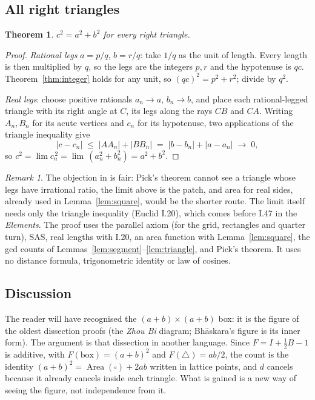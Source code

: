 \documentclass[11pt,a4paper]{article}
\newtheorem{theorem}{Theorem}
\theoremstyle{remark}
\newtheorem*{remark}{Remark}
\begin{document}
\subsection*{All right triangles}

\begin{theorem}\label{thm:general}
$c^2=a^2+b^2$ for every right triangle.
\end{theorem}

\begin{proof}
\emph{Rational legs} $a=p/q$, $b=r/q$: take $1/q$ as the unit of length. Every
length is then multiplied by $q$, so the legs are the integers $p,r$ and the
hypotenuse is $qc$. Theorem~\ref{thm:integer} holds for any unit, so
$(qc)^2=p^2+r^2$; divide by $q^2$.

\emph{Real legs}: choose positive rationals $a_n\to a$, $b_n\to b$, and place each
rational-legged triangle with its right angle at $C$, its legs along the rays
$CB$ and $CA$. Writing $A_n,B_n$ for its acute vertices and $c_n$ for its
hypotenuse, two applications of the triangle inequality give
\[
|c-c_n|\;\le\;|AA_n|+|BB_n|\;=\;|b-b_n|+|a-a_n|\;\longrightarrow\;0 ,
\]
so $c^2=\lim c_n^{\,2}=\lim\,(a_n^2+b_n^2)=a^2+b^2$.
\end{proof}

\begin{remark}
The objection in \cite{mse} is fair: Pick's theorem cannot see a triangle whose
legs have irrational ratio, the limit above is the patch, and area for real
sides, already used in Lemma~\ref{lem:square}, would be the shorter route. The
limit itself needs only the triangle inequality (Euclid I.20), which comes before
I.47 in the \emph{Elements}. The proof uses the parallel axiom (for the grid,
rectangles and quarter turn), SAS, real lengths with I.20, an area function with
Lemma~\ref{lem:square}, the gcd counts of
Lemmas~\ref{lem:segment}--\ref{lem:triangle}, and Pick's theorem. It uses no
distance formula, trigonometric identity or law of cosines.
\end{remark}

\subsection*{Discussion}

The reader will have recognised the $(a+b)\times(a+b)$ box: it is the figure of
the oldest dissection proofs (the \emph{Zhou Bi} diagram; Bh\=askara's figure is
its inner form). The argument is that dissection in another language. Since
$F=I+\tfrac12B-1$ is additive, with $F(\text{box})=(a+b)^2$ and
$F(\triangle)=ab/2$, the count is the identity
$(a+b)^2=\operatorname{Area}(\square)+2ab$ written in lattice points, and $d$
cancels because it already cancels inside each triangle. What is gained is a new
way of seeing the figure, not independence from it.
\end{document}
